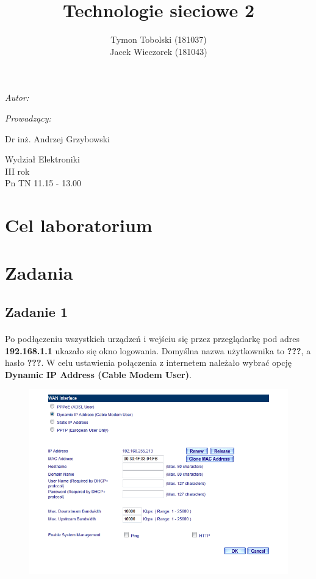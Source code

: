 \documentclass[wide,a4paper,titlepage,12pt] {article}
\title{Technologie sieciowe 2}
\author{Tymon Tobolski (181037)\\ Jacek Wieczorek (181043)}
\makeatletter
\renewcommand{\maketitle}{
\begin{titlepage}
  \begin{center}
    \vspace*{3cm}
    \LARGE \@title \par
    \vspace{2cm}
    \textit{\small Autor:}\par
    \normalsize \@author\par \normalsize
    \vspace{3cm}
    \textit{\small Prowadzący:}\par
    Dr inż. Andrzej Grzybowski\par
    \vspace{2cm}
    Wydział Elektroniki\\ III rok\\ Pn TN 11.15 - 13.00\par
    \vspace{4cm}
    \small \@date
  \end{center}
\end{titlepage}
}
\makeatother
\begin{document}
\maketitle
  \section{Cel laboratorium}
  \paragraph{}

  \section{Zadania}

  \subsection{Zadanie 1}
  \paragraph{}
  Po podłączeniu wszystkich urządzeń i wejściu się przez przeglądarkę pod adres \textbf{192.168.1.1} ukazało się okno logowania. Domyślna nazwa użytkownika to \textbf{???}, a hasło \textbf{???}.
  W celu ustawienia połączenia z internetem należało wybrać opcję \textbf{Dynamic IP Address (Cable Modem User)}.

  \begin{figure}[h!]
    \begin{center}
      \includegraphics[width=\textwidth]{1.PNG}
    \end{center}
  \end{figure}
\end{document}
